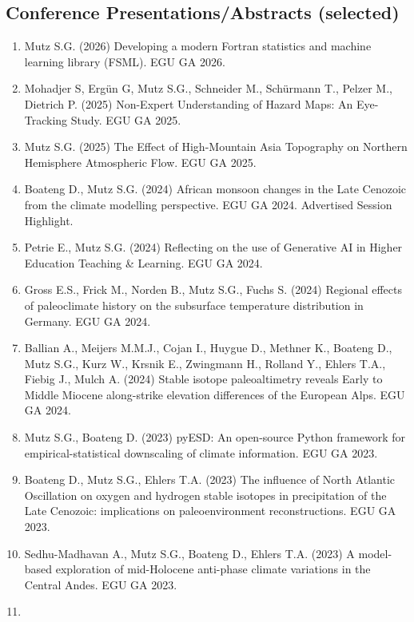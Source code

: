 \documentclass[
  letterpaper,
  DIV=11,
  numbers=noendperiod]{scrartcl}
\begin{document}
\subsection{Conference Presentations/Abstracts
(selected)}\label{conference-presentationsabstracts-selected}

\begin{enumerate}
\def\labelenumi{\arabic{enumi}.}
\item
  Mutz S.G. (2026) Developing a modern Fortran statistics and machine
  learning library (FSML). EGU GA 2026.
\item
  Mohadjer S, Ergün G, Mutz S.G., Schneider M., Schürmann T., Pelzer M.,
  Dietrich P. (2025) Non-Expert Understanding of Hazard Maps: An
  Eye-Tracking Study. EGU GA 2025.
\item
  Mutz S.G. (2025) The Effect of High-Mountain Asia Topography on
  Northern Hemisphere Atmospheric Flow. EGU GA 2025.
\item
  Boateng D., Mutz S.G. (2024) African monsoon changes in the Late
  Cenozoic from the climate modelling perspective. EGU GA 2024.
  Advertised Session Highlight.
\item
  Petrie E., Mutz S.G. (2024) Reflecting on the use of Generative AI in
  Higher Education Teaching \& Learning. EGU GA 2024.
\item
  Gross E.S., Frick M., Norden B., Mutz S.G., Fuchs S. (2024) Regional
  effects of paleoclimate history on the subsurface temperature
  distribution in Germany. EGU GA 2024.
\item
  Ballian A., Meijers M.M.J., Cojan I., Huygue D., Methner K., Boateng
  D., Mutz S.G., Kurz W., Krsnik E., Zwingmann H., Rolland Y., Ehlers
  T.A., Fiebig J., Mulch A. (2024) Stable isotope paleoaltimetry reveals
  Early to Middle Miocene along-strike elevation differences of the
  European Alps. EGU GA 2024.
\item
  Mutz S.G., Boateng D. (2023) pyESD: An open-source Python framework
  for empirical-statistical downscaling of climate information. EGU GA
  2023.
\item
  Boateng D., Mutz S.G., Ehlers T.A. (2023) The influence of North
  Atlantic Oscillation on oxygen and hydrogen stable isotopes in
  precipitation of the Late Cenozoic: implications on paleoenvironment
  reconstructions. EGU GA 2023.
\item
  Sedhu-Madhavan A., Mutz S.G., Boateng D., Ehlers T.A. (2023) A
  model-based exploration of mid-Holocene anti-phase climate variations
  in the Central Andes. EGU GA 2023.
\item

\end{enumerate}
\end{document}
